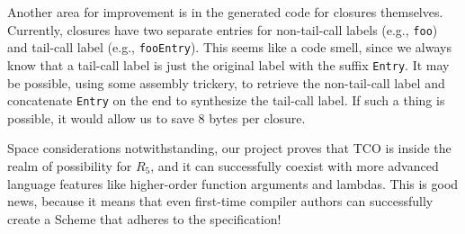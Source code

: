 \documentclass[12pt]{article}
\begin{document}
Another area for improvement is in the generated code for closures themselves.
Currently, closures have two separate entries for non-tail-call labels (e.g.,
\verb+foo+) and tail-call label (e.g., \verb+fooEntry+). This seems like a code
smell, since we always know that a tail-call label is just the original label with
the suffix \verb+Entry+. It may be possible, using some assembly trickery, to
retrieve the non-tail-call label and concatenate \verb+Entry+ on the end to
synthesize the tail-call label. If such a thing is possible, it would allow us
to save 8 bytes per closure.

Space considerations notwithstanding, our project proves that TCO is inside the
realm of possibility for $R_5$, and it can successfully coexist with more advanced
language features like higher-order function arguments and lambdas. This is good
news, because it means that even first-time compiler authors can successfully
create a Scheme that adheres to the specification!
\end{document}
